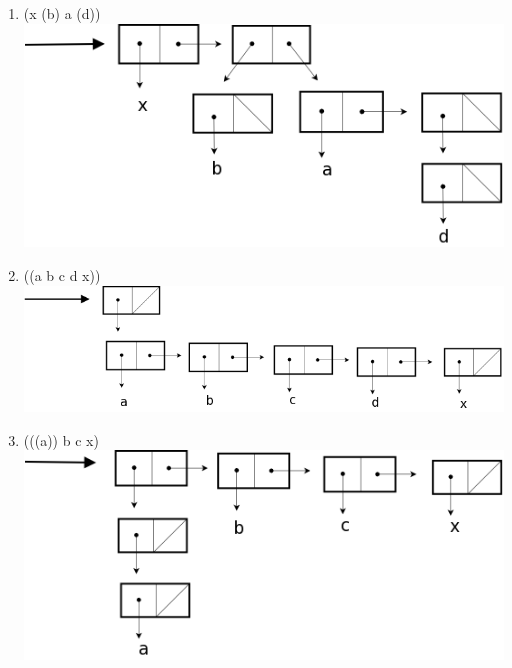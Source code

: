 \documentclass[a4paper, 11pt]{article}
\begin{document}
\begin{enumerate}
    \item (x (b) a (d))\\ \includegraphics[scale=0.3]{reponse4.png}
    \item ((a b c d x))\\ \includegraphics[scale=0.3]{reponse5.png}
    \item (((a)) b c x)\\ \includegraphics[scale=0.3]{reponse6.png}
\end{enumerate}

%
\end{document}

